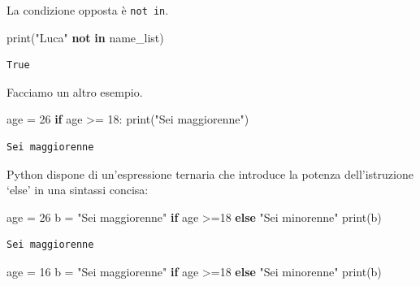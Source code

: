 \documentclass[
  letterpaper,
  krantz2]{{[}./krantz{]}}
\newenvironment{Shaded}{\begin{snugshade}}{\end{snugshade}}
\newcommand{\BuiltInTok}[1]{\textcolor[rgb]{0.00,0.23,0.31}{#1}}
\newcommand{\ControlFlowTok}[1]{\textcolor[rgb]{0.00,0.23,0.31}{\textbf{#1}}}
\newcommand{\DecValTok}[1]{\textcolor[rgb]{0.68,0.00,0.00}{#1}}
\newcommand{\KeywordTok}[1]{\textcolor[rgb]{0.00,0.23,0.31}{\textbf{#1}}}
\newcommand{\NormalTok}[1]{\textcolor[rgb]{0.00,0.23,0.31}{#1}}
\newcommand{\OperatorTok}[1]{\textcolor[rgb]{0.37,0.37,0.37}{#1}}
\newcommand{\StringTok}[1]{\textcolor[rgb]{0.13,0.47,0.30}{#1}}
\begin{document}
La condizione opposta è \texttt{not\ in}.

\begin{Shaded}
\begin{Highlighting}[]
\BuiltInTok{print}\NormalTok{(}\StringTok{"Luca"} \KeywordTok{not} \KeywordTok{in}\NormalTok{ name\_list)}
\end{Highlighting}
\end{Shaded}

\begin{verbatim}
True
\end{verbatim}

Facciamo un altro esempio.

\begin{Shaded}
\begin{Highlighting}[]
\NormalTok{age }\OperatorTok{=} \DecValTok{26}
\ControlFlowTok{if}\NormalTok{ age }\OperatorTok{\textgreater{}=} \DecValTok{18}\NormalTok{:}
    \BuiltInTok{print}\NormalTok{(}\StringTok{"Sei maggiorenne"}\NormalTok{)}
\end{Highlighting}
\end{Shaded}

\begin{verbatim}
Sei maggiorenne
\end{verbatim}

Python dispone di un'espressione ternaria che introduce la potenza
dell'istruzione `else' in una sintassi concisa:

\begin{Shaded}
\begin{Highlighting}[]
\NormalTok{age }\OperatorTok{=} \DecValTok{26}
\NormalTok{b }\OperatorTok{=} \StringTok{"Sei maggiorenne"} \ControlFlowTok{if}\NormalTok{ age }\OperatorTok{\textgreater{}=}\DecValTok{18} \ControlFlowTok{else} \StringTok{"Sei minorenne"}
\BuiltInTok{print}\NormalTok{(b)}
\end{Highlighting}
\end{Shaded}

\begin{verbatim}
Sei maggiorenne
\end{verbatim}

\begin{Shaded}
\begin{Highlighting}[]
\NormalTok{age }\OperatorTok{=} \DecValTok{16}
\NormalTok{b }\OperatorTok{=} \StringTok{"Sei maggiorenne"} \ControlFlowTok{if}\NormalTok{ age }\OperatorTok{\textgreater{}=}\DecValTok{18} \ControlFlowTok{else} \StringTok{"Sei minorenne"}
\BuiltInTok{print}\NormalTok{(b)}
\end{Highlighting}
\end{Shaded}
\end{document}
